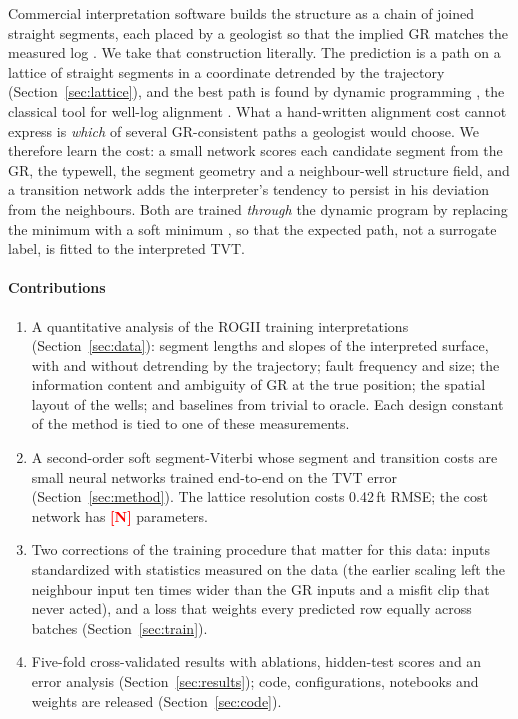\documentclass[preprint,12pt,authoryear]{elsarticle}
\newcommand{\PH}[1]{\textcolor{red}{\textbf{[#1]}}}
\begin{document}
Commercial interpretation software builds the structure as a chain of joined straight segments, each placed by a geologist so that the implied GR matches the measured log \citep{rogii2026}. We take that construction literally. The prediction is a path on a lattice of straight segments in a coordinate detrended by the trajectory (Section~\ref{sec:lattice}), and the best path is found by dynamic programming \citep{viterbi1967,forney1973}, the classical tool for well-log alignment \citep{sakoe1978,wheeler2015}. What a hand-written alignment cost cannot express is \emph{which} of several GR-consistent paths a geologist would choose. We therefore learn the cost: a small network scores each candidate segment from the GR, the typewell, the segment geometry and a neighbour-well structure field, and a transition network adds the interpreter's tendency to persist in his deviation from the neighbours. Both are trained \emph{through} the dynamic program by replacing the minimum with a soft minimum \citep{mensch2018diffdp,cuturi2017softdtw}, so that the expected path, not a surrogate label, is fitted to the interpreted TVT.

\paragraph{Contributions}
\begin{enumerate}
\item A quantitative analysis of the ROGII training interpretations (Section~\ref{sec:data}): segment lengths and slopes of the interpreted surface, with and without detrending by the trajectory; fault frequency and size; the information content and ambiguity of GR at the true position; the spatial layout of the wells; and baselines from trivial to oracle. Each design constant of the method is tied to one of these measurements.
\item A second-order soft segment-Viterbi whose segment and transition costs are small neural networks trained end-to-end on the TVT error (Section~\ref{sec:method}). The lattice resolution costs 0.42\,ft RMSE; the cost network has \PH{N} parameters.
\item Two corrections of the training procedure that matter for this data: inputs standardized with statistics measured on the data (the earlier scaling left the neighbour input ten times wider than the GR inputs and a misfit clip that never acted), and a loss that weights every predicted row equally across batches (Section~\ref{sec:train}).
\item Five-fold cross-validated results with ablations, hidden-test scores and an error analysis (Section~\ref{sec:results}); code, configurations, notebooks and weights are released (Section~\ref{sec:code}).
\end{enumerate}
\end{document}
